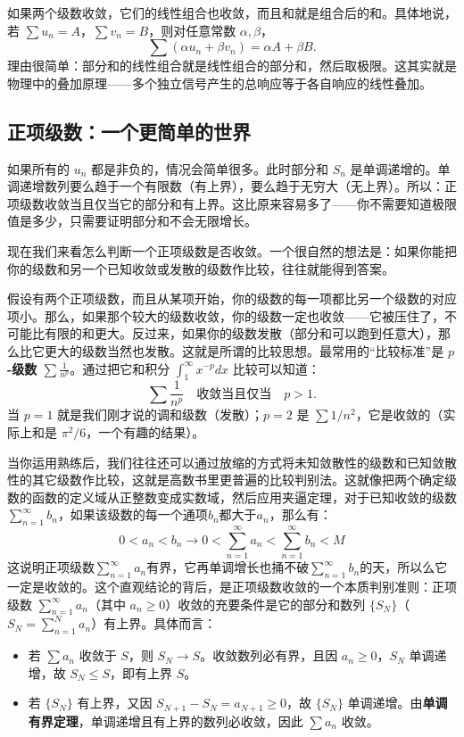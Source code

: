 \documentclass[UTF8]{ctexbook}
\begin{document}
如果两个级数收敛，它们的线性组合也收敛，而且和就是组合后的和。具体地说，若 $\sum u_n = A$，$\sum v_n = B$，则对任意常数 $\alpha, \beta$，
\[
\sum (\alpha u_n + \beta v_n) = \alpha A + \beta B.
\]
理由很简单：部分和的线性组合就是线性组合的部分和，然后取极限。这其实就是物理中的叠加原理——多个独立信号产生的总响应等于各自响应的线性叠加。

\subsection{正项级数：一个更简单的世界}

如果所有的 $u_n$ 都是非负的，情况会简单很多。此时部分和 $S_n$ 是单调递增的。单调递增数列要么趋于一个有限数（有上界），要么趋于无穷大（无上界）。所以：正项级数收敛当且仅当它的部分和有上界。这比原来容易多了——你不需要知道极限值是多少，只需要证明部分和不会无限增长。

现在我们来看怎么判断一个正项级数是否收敛。一个很自然的想法是：如果你能把你的级数和另一个已知收敛或发散的级数作比较，往往就能得到答案。

假设有两个正项级数，而且从某项开始，你的级数的每一项都比另一个级数的对应项小。那么，如果那个较大的级数收敛，你的级数一定也收敛——它被压住了，不可能比有限的和更大。反过来，如果你的级数发散（部分和可以跑到任意大），那么比它更大的级数当然也发散。这就是所谓的比较思想。最常用的“比较标准”是\textbf{ $p$-级数 $\sum \frac{1}{n^p}$}。通过把它和积分 $\int_1^\infty x^{-p} dx$ 比较可以知道：
\[
\sum \frac{1}{n^p} \quad \text{收敛当且仅当} \quad p > 1.
\]
当 $p=1$ 就是我们刚才说的调和级数（发散）；$p=2$ 是 $\sum 1/n^2$，它是收敛的（实际上和是 $\pi^2/6$，一个有趣的结果）。

当你运用熟练后，我们往往还可以通过放缩的方式将未知敛散性的级数和已知敛散性的其它级数作比较，这就是高数书里更普遍的比较判别法。这就像把两个确定级数的函数的定义域从正整数变成实数域，然后应用夹逼定理，对于已知收敛的级数$\sum_{n=1}^{\infty}b_n$，如果该级数的每一个通项$b_n$都大于$a_n$，那么有：
\[
0<a_n<b_n \longrightarrow 0<\sum_{n=1}^{\infty}a_n<\sum_{n=1}^{\infty}b_n<M
\]
这说明正项级数$\sum_{n=1}^{\infty}a_n$有界，它再单调增长也捅不破$\sum_{n=1}^{\infty}b_n$的天，所以么它一定是收敛的。这个直观结论的背后，是正项级数收敛的一个本质判别准则：正项级数 $\sum_{n=1}^{\infty} a_n$（其中 $a_n \ge 0$）收敛的充要条件是它的部分和数列 $\{S_N\}$（$S_N = \sum_{n=1}^{N} a_n$）有上界。具体而言：
\begin{itemize}
    \item[$\Rightarrow$] 若 $\sum a_n$ 收敛于 $S$，则 $S_N \to S$。收敛数列必有界，且因 $a_n \ge 0$，$S_N$ 单调递增，故 $S_N \le S$，即有上界 $S$。
    \item[$\Leftarrow$] 若 $\{S_N\}$ 有上界，又因 $S_{N+1} - S_N = a_{N+1} \ge 0$，故 $\{S_N\}$ 单调递增。由\textbf{单调有界定理}，单调递增且有上界的数列必收敛，因此 $\sum a_n$ 收敛。
\end{itemize}
\end{document}
